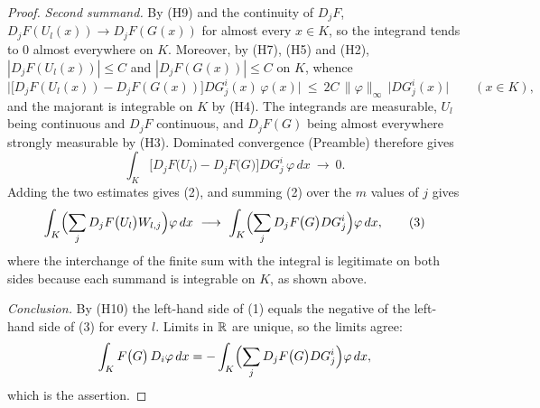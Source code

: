 \begin{proof}
\emph{Second summand.}  By (H9) and the continuity of $D_jF$,
$D_jF(U_l(x))\to D_jF(G(x))$ for almost every $x\in K$, so the integrand tends
to $0$ almost everywhere on $K$.  Moreover, by (H7), (H5) and (H2),
$|D_jF(U_l(x))|\le C$ and $|D_jF(G(x))|\le C$ on $K$, whence
\[
\bigl|\bigl[D_jF(U_l(x))-D_jF(G(x))\bigr]DG^i_j(x)\,\varphi(x)\bigr|
\ \le\ 2C\,\|\varphi\|_\infty\,\bigl|DG^i_j(x)\bigr|
\qquad(x\in K),
\]
and the majorant is integrable on $K$ by (H4).  The integrands are measurable,
$U_l$ being continuous and $D_jF$ continuous, and $D_jF(G)$ being almost
everywhere strongly measurable by (H3).  Dominated convergence (Preamble)
therefore gives
\[
\int_K\bigl[D_jF\bigl(U_l\bigr)-D_jF\bigl(G\bigr)\bigr]DG^i_j\,\varphi\,dx
\ \longrightarrow\ 0 .
\]
Adding the two estimates gives (2), and summing (2) over the $m$ values of $j$
gives
\[
\int_K\Bigl(\sum_jD_jF\bigl(U_l\bigr)W_{l,j}\Bigr)\varphi\,dx
\ \longrightarrow\
\int_K\Bigl(\sum_jD_jF\bigl(G\bigr)DG^i_j\Bigr)\varphi\,dx ,
\tag{3}
\]
where the interchange of the finite sum with the integral is legitimate on both
sides because each summand is integrable on $K$, as shown above.

\emph{Conclusion.}  By (H10) the left-hand side of (1) equals the negative of
the left-hand side of (3) for every $l$.  Limits in $\mathbb{R}$ are unique, so the
limits agree:
\[
\int_K F\bigl(G\bigr)\,D_i\varphi\,dx
=-\int_K\Bigl(\sum_jD_jF\bigl(G\bigr)DG^i_j\Bigr)\varphi\,dx ,
\]
which is the assertion.
\end{proof}
